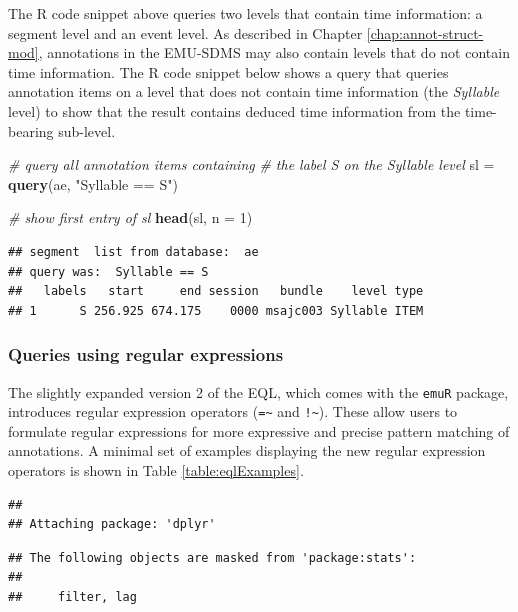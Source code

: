 \documentclass[]{book}
\newenvironment{Shaded}{\begin{snugshade}}{\end{snugshade}}
\newcommand{\CommentTok}[1]{\textcolor[rgb]{0.56,0.35,0.01}{\textit{#1}}}
\newcommand{\DataTypeTok}[1]{\textcolor[rgb]{0.13,0.29,0.53}{#1}}
\newcommand{\DecValTok}[1]{\textcolor[rgb]{0.00,0.00,0.81}{#1}}
\newcommand{\KeywordTok}[1]{\textcolor[rgb]{0.13,0.29,0.53}{\textbf{#1}}}
\newcommand{\NormalTok}[1]{#1}
\newcommand{\StringTok}[1]{\textcolor[rgb]{0.31,0.60,0.02}{#1}}
\theoremstyle{definition}
\theoremstyle{definition}
\theoremstyle{definition}
\theoremstyle{remark}
\begin{document}
The R code snippet above queries two levels that contain time
information: a segment level and an event level. As described in Chapter
\ref{chap:annot-struct-mod}, annotations in the EMU-SDMS may also
contain levels that do not contain time information. The R code snippet
below shows a query that queries annotation items on a level that does
not contain time information (the \emph{Syllable} level) to show that
the result contains deduced time information from the time-bearing
sub-level.

\begin{Shaded}
\begin{Highlighting}[]
\CommentTok{# query all annotation items containing}
\CommentTok{# the label S on the Syllable level}
\NormalTok{sl =}\StringTok{ }\KeywordTok{query}\NormalTok{(ae, }\StringTok{"Syllable == S"}\NormalTok{)}

\CommentTok{# show first entry of sl}
\KeywordTok{head}\NormalTok{(sl, }\DataTypeTok{n =} \DecValTok{1}\NormalTok{)}
\end{Highlighting}
\end{Shaded}

\begin{verbatim}
## segment  list from database:  ae 
## query was:  Syllable == S 
##   labels   start     end session   bundle    level type
## 1      S 256.925 674.175    0000 msajc003 Syllable ITEM
\end{verbatim}

\hypertarget{queries-using-regular-expressions}{%
\subsubsection{Queries using regular
expressions}\label{queries-using-regular-expressions}}

The slightly expanded version 2 of the EQL, which comes with the
\texttt{emuR} package, introduces regular expression operators
(\texttt{=\textasciitilde{}} and \texttt{!\textasciitilde{}}). These
allow users to formulate regular expressions for more expressive and
precise pattern matching of annotations. A minimal set of examples
displaying the new regular expression operators is shown in Table
\ref{table:eqlExamples}.

\begin{verbatim}
## 
## Attaching package: 'dplyr'
\end{verbatim}

\begin{verbatim}
## The following objects are masked from 'package:stats':
## 
##     filter, lag
\end{verbatim}
\end{document}
